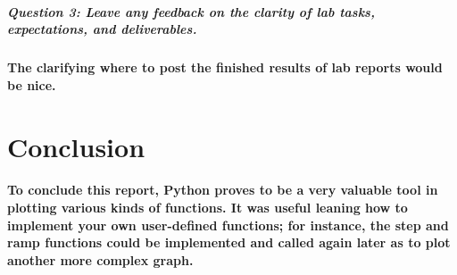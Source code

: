 \documentclass[12pt,a4paper]{article}
\begin{document}
\subparagraph{\large Question 3: Leave any feedback on the clarity of lab tasks, expectations, and deliverables.
}

\paragraph{The clarifying where to post the finished results of lab reports would be nice.}

\section{Conclusion}\label{sec:res}

\paragraph{To conclude this report, Python proves to be a very valuable tool in plotting various kinds of functions. It was useful leaning how to implement your own user-defined functions; for instance, the step and ramp functions could be implemented and called again later as to plot another more complex graph.}




\end{document}

